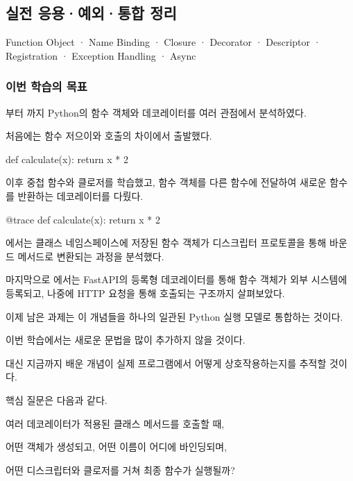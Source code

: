 

\subsection{실전 응용·예외·통합 정리}

Function Object · Name Binding · Closure · Decorator · Descriptor · Registration · Exception Handling · Async

\subsubsection{이번 학습의 목표}

부터 까지 Python의 함수 객체와 데코레이터를 여러 관점에서 분석하였다.

처음에는 함수 저으이와 호출의 차이에서 출발했다.

\begin{dhkcode}
def calculate(x):
    return x * 2
\end{dhkcode}

이후 중첩 함수와 클로저를 학습했고, 함수 객체를 다른 함수에 전달하여 새로운 함수를 반환하는 데코레이터를 다뤘다.

\begin{dhkcode}
@trace
def calculate(x):
    return x * 2
\end{dhkcode}

에서는 클래스 네임스페이스에 저장된 함수 객체가 디스크립터 프로토콜을 통해 바운드 메서드로 변환되는 과정을 분석했다.

마지막으로 에서는 FastAPI의 등록형 데코레이터를 통해 함수 객체가 외부 시스템에 등록되고, 나중에 HTTP 요청을 통해 호출되는 구조까지 살펴보았다.

이제 남은 과제는 이 개념들을 하나의 일관된 Python 실행 모델로 통합하는 것이다.

이번 학습에서는 새로운 문법을 많이 추가하지 않을 것이다.

대신 지금까지 배운 개념이 실제 프로그램에서 어떻게 상호작용하는지를 추적할 것이다.

핵심 질문은 다음과 같다.

\begin{dhksmry}[centered]
여러 데코레이터가 적용된 클래스 메서드를 호출할 때,

어떤 객체가 생성되고, 어떤 이름이 어디에 바인딩되며,

어떤 디스크립터와 클로저를 거쳐 최종 함수가 실행될까?
\end{dhksmry}

